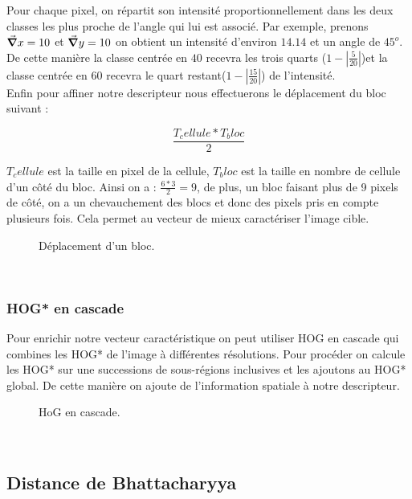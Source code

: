 Pour chaque pixel, on répartit son intensité proportionnellement dans les deux classes les plus proche de l'angle qui lui est associé. 
Par exemple, prenons $\grad x = 10$ et $\grad y = 10$ on obtient un intensité d'environ $14.14$ et un angle de $45^o$. De cette manière la classe centrée en $40$ recevra les trois quarts ($1 - |\frac{5}{20}|$)et la classe centrée en $60$ recevra le quart restant($1 - |\frac{15}{20}|$) de l'intensité.\\


Enfin pour affiner notre descripteur nous effectuerons le déplacement du bloc suivant :

\[ \frac{T_cellule * T_bloc}{2} \]

$T_cellule$ est la taille en pixel de la cellule,
$T_bloc$ est la taille en nombre de cellule d'un côté du bloc.
Ainsi on a : $\frac{6*3}{2} = 9$, de plus, un bloc faisant plus de 9 pixels de côté, on a un chevauchement des blocs et donc des pixels pris en compte plusieurs fois. Cela permet au vecteur de mieux caractériser l'image cible.

\begin{figure}[!htbp]
\center
\caption{Déplacement d'un bloc.}
\label{fig:blocOverlap}
\end{figure}
\\

\subsubsection{HOG* en cascade}

Pour enrichir notre vecteur caractéristique on peut utiliser HOG en cascade qui combines les HOG* de l'image à différentes résolutions. Pour procéder on calcule les HOG* sur une successions de sous-régions inclusives et les ajoutons au HOG* global. De cette manière on ajoute de l'information spatiale à notre descripteur.

\begin{figure}[!htbp]
\center
\caption{HoG en cascade.}
\label{fig:cuttlefish_hog}
\end{figure}
\\

\subsection{Distance de Bhattacharyya}

